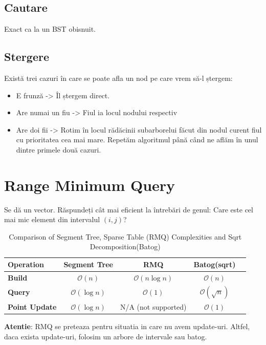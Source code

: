 \documentclass[11pt,a4paper]{article}
\theoremstyle{definition}
\theoremstyle{plain}
\theoremstyle{remark}
\begin{document}
\subsection*{Cautare}
Exact ca la un BST obisnuit.

\subsection*{Stergere}
Există trei cazuri în care se poate afla un nod pe care vrem să-l ștergem:

\begin{itemize}
    \item E frunză -> Îl ștergem direct.
    \item Are numai un fiu -> Fiul ia locul nodului respectiv
    \item Are doi fii -> Rotim în locul rădăcinii subarborelui făcut din nodul curent fiul cu prioritatea cea mai mare. Repetăm algoritmul până când ne aflăm în unul dintre primele două cazuri.
\end{itemize}


\section{Range Minimum Query}
Se dă un vector. Răspundeți cât mai eficient la întrebări de genul: Care este cel mai mic element din intervalul $(i, j)$?

\begin{table}[h!]
\centering
\label{tab:ds_comparison}
\begin{tabular}{lcccc}
    \toprule
    \textbf{Operation} & \textbf{Segment Tree} & \textbf{RMQ} & \textbf{Batog(sqrt)} \\
    \midrule
    \textbf{Build} & $\mathcal{O}(n)$ & $\mathcal{O}(n \log n)$ & $\mathcal{O}(n)$ \\
    \textbf{Query} & $\mathcal{O}(\log n)$ & $\mathcal{O}(1)$ & $\mathcal{O}(\sqrt{n})$  \\
    \textbf{Point Update} & $\mathcal{O}(\log n)$ & N/A (not supported) & $\mathcal{O}(1)$ \\
    \bottomrule
\end{tabular}
\caption{Comparison of Segment Tree, Sparse Table (RMQ) Complexities and Sqrt Decomposition(Batog)}
\end{table}

\textbf{Atentie}: RMQ se preteaza pentru situatia in care nu avem update-uri. Altfel, daca exista update-uri, folosim un arbore de intervale sau batog.
\end{document}
